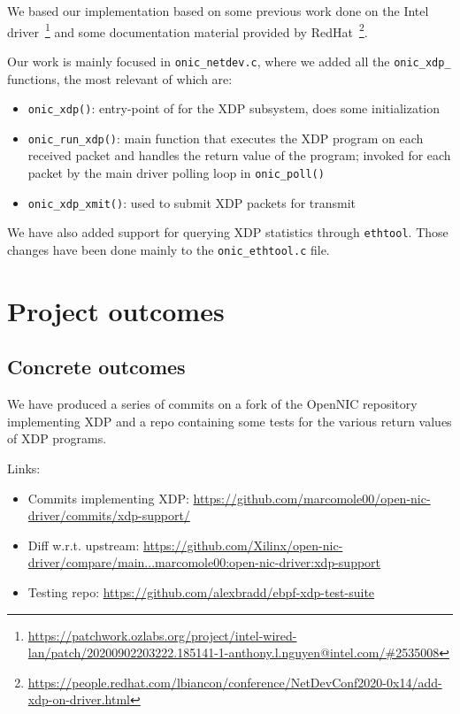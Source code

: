 \documentclass[10pt,a4]{article}
\begin{document}

We based our implementation based on some previous work done on the Intel
driver~\footnote{\url{https://patchwork.ozlabs.org/project/intel-wired-lan/patch/20200902203222.185141-1-anthony.l.nguyen@intel.com/\#2535008}}
and some documentation material provided by RedHat~\footnote{\url{https://people.redhat.com/lbiancon/conference/NetDevConf2020-0x14/add-xdp-on-driver.html}}.

Our work is mainly focused in \texttt{onic\_netdev.c}, where we added all the
\texttt{onic\_xdp\_\*} functions, the most relevant of which are:

\begin{itemize}
  \item \texttt{onic\_xdp()}: entry-point of for the XDP subsystem, does some
    initialization
  \item \texttt{onic\_run\_xdp()}: main function that executes the XDP program
    on each received packet and handles the return value of the program; invoked
    for each packet by the main driver polling loop in \texttt{onic\_poll()}
  \item \texttt{onic\_xdp\_xmit()}: used to submit XDP packets for transmit
\end{itemize}

We have also added support for querying XDP statistics through \texttt{ethtool}.
Those changes have been done mainly to the \texttt{onic\_ethtool.c} file.


\section{Project outcomes}

\subsection{Concrete outcomes}
%

We have produced a series of commits on a fork of the OpenNIC repository
implementing XDP and a repo containing some tests for the various return
values of XDP programs.

Links:

\begin{itemize}
  \item Commits implementing XDP: \url{https://github.com/marcomole00/open-nic-driver/commits/xdp-support/}
  \item Diff w.r.t. upstream: \url{https://github.com/Xilinx/open-nic-driver/compare/main...marcomole00:open-nic-driver:xdp-support}
  \item Testing repo: \url{https://github.com/alexbradd/ebpf-xdp-test-suite}
\end{itemize}
\end{document}
